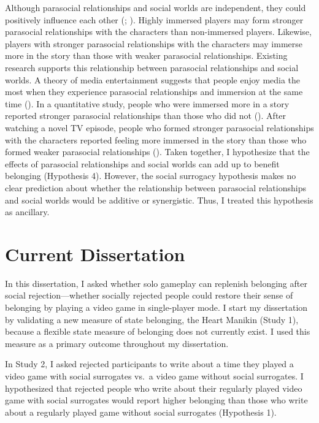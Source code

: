 \documentclass[
]{udthesis}
\begin{document}
Although parasocial relationships and social worlds are independent,
they could positively influence each other
(; ).
Highly immersed players may form stronger parasocial relationships with
the characters than non-immersed players. Likewise, players with
stronger parasocial relationships with the characters may immerse more
in the story than those with weaker parasocial relationships. Existing
research supports this relationship between parasocial relationships and
social worlds. A theory of media entertainment suggests that people
enjoy media the most when they experience parasocial relationships and
immersion at the same time (). In a
quantitative study, people who were immersed more in a story reported
stronger parasocial relationships than those who did not
(). After watching a
novel TV episode, people who formed stronger parasocial relationships
with the characters reported feeling more immersed in the story than
those who formed weaker parasocial relationships
(). Taken together, I
hypothesize that the effects of parasocial relationships and social
worlds can add up to benefit belonging (Hypothesis 4). However, the
social surrogacy hypothesis makes no clear prediction about whether the
relationship between parasocial relationships and social worlds would be
additive or synergistic. Thus, I treated this hypothesis as ancillary.

\section{Current Dissertation}\label{current-dissertation-1}

In this dissertation, I asked whether solo gameplay can replenish
belonging after social rejection---whether socially rejected people
could restore their sense of belonging by playing a video game in
single-player mode. I start my dissertation by validating a new measure
of state belonging, the Heart Manikin (Study 1), because a flexible
state measure of belonging does not currently exist. I used this measure
as a primary outcome throughout my dissertation.

In Study 2, I asked rejected participants to write about a time they
played a video game with social surrogates vs.~a video game without
social surrogates. I hypothesized that rejected people who write about
their regularly played video game with social surrogates would report
higher belonging than those who write about a regularly played game
without social surrogates (Hypothesis 1).
\end{document}
